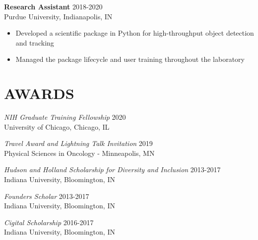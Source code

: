 \documentclass[margin, 10pt]{res} %
\begin{document}
\begin{resume}
\begin{itemize}
\end{itemize}
 
\textbf{Research Assistant} \hfill 2018-2020\\
Purdue University, Indianapolis, IN
\begin{itemize} \itemsep -2pt

\item Developed a scientific package in Python for high-throughput object detection and tracking
\item Managed the package lifecycle and user training throughout the laboratory

\end{itemize}





\section{AWARDS}

{\sl NIH Graduate Training Fellowship} \hfill 2020 \\
University of Chicago, Chicago, IL

{\sl Travel Award and Lightning Talk Invitation} \hfill 2019 \\
Physical Sciences in Oncology - Minneapolis, MN

{\sl Hudson and Holland Scholarship for Diversity and Inclusion} \hfill 2013-2017 \\
Indiana University, Bloomington, IN 

{\sl Founders Scholar} \hfill 2013-2017 \\
Indiana University, Bloomington, IN 

{\sl Cigital Scholarship} \hfill 2016-2017 \\
Indiana University, Bloomington, IN 


\end{resume}
\end{document}
